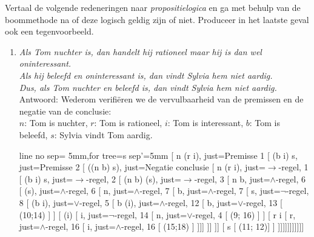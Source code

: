 \newpage
\begin{answer} %
Vertaal de volgende redeneringen naar \textit{propositielogica} en ga met behulp van de boommethode na of deze logisch geldig zijn of niet. Produceer in het laatste geval ook een tegenvoorbeeld.
\begin{enumerate}[label=\textit{\alph*.}]
\item \textit{Als Tom nuchter is, dan handelt hij rationeel maar hij is dan wel oninteressant.}\\
\textit{Als hij beleefd en oninteressant is, dan vindt Sylvia hem niet aardig.}\\
\textit{Dus, als Tom nuchter en beleefd is, dan vindt Sylvia hem niet aardig.}\\
Antwoord: Wederom verifi\"eren we de vervulbaarheid van de premissen en de negatie van de conclusie:\\
    $n$: Tom is nuchter, $r$: Tom is rationeel, $i$: Tom is interessant, $b$: Tom is beleefd, $s$: Sylvia vindt Tom aardig.
\begin{center}
\begin{tableau}{line no sep= 5mm,for tree={s sep'=5mm}}
[ n \to (r \land \neg i),                 just={Premisse 1}
[ (b \land \neg i) \to \neg s,            just={Premisse 2}
[ \neg ((n \land b) \to \neg s),          just={Negatie conclusie}
[ \neg n \lor (r \land \neg i),           just={$\to$-regel, 1}
[ \neg(b \land \neg i) \lor \neg s,       just={$\to$-regel, 2}
[ (n \land b) \land \neg (\neg s),        just={$\to$-regel, 3}
[ n \land b,                              just={$\land$-regel, 6}
[ \neg (\neg s),                          just={$\land$-regel, 6}
[ n,                                      just={$\land$-regel, 7}
[ b,                                      just={$\land$-regel, 7}
[ s,                                      just={$\neg$-regel, 8}
  [ \neg (b \land \neg i),                just={$\lor$-regel, 5}
  [ \neg b \lor \neg (\neg i),            just={$\land$-regel, 12}
    [ \neg b,                             just={$\lor$-regel, 13}
      [ \bot (10;14) ]
    ]
    [ \neg (\neg i)
    [ i,                                  just={$\neg$-regel, 14}
      [ \neg n,                           just={$\lor$-regel, 4}
        [ \bot(9; 16) ]
      ]
      [ r \land \neg i
      [ r,                                just={$\land$-regel, 16}
      [ \neg i,                           just={$\land$-regel, 16}
        [ \bot(15;18) ]
      ]]]
    ]]
  ]]
  [ \neg s [ \bot (11; 12)]
  ]
]]]]]]]]]]]
\end{tableau}\\[3mm]

\end{center}
\end{enumerate}
\end{answer}
